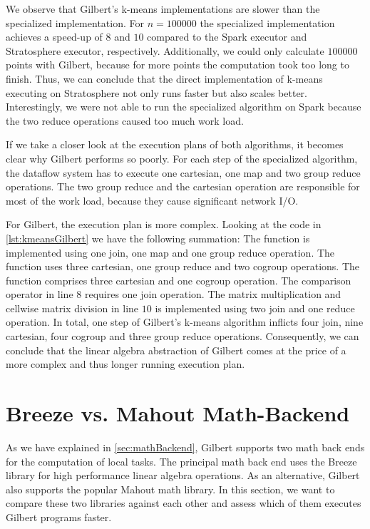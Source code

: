 We observe that Gilbert's k-means implementations are slower than the specialized implementation.
For $n=100000$ the specialized implementation achieves a speed-up of $8$ and $10$ compared to the Spark executor and Stratosphere executor, respectively.
Additionally, we could only calculate $100000$ points with Gilbert, because for more points the computation took too long to finish.
Thus, we can conclude that the direct implementation of k-means executing on Stratosphere not only runs faster but also scales better.
Interestingly, we were not able to run the specialized algorithm on Spark because the two reduce operations caused too much work load.

If we take a closer look at the execution plans of both algorithms, it becomes clear why Gilbert performs so poorly.
For each step of the specialized algorithm, the dataflow system has to execute one cartesian, one map and two group reduce operations.
The two group reduce and the cartesian operation are responsible for most of the work load, because they cause significant network I/O.

For Gilbert, the execution plan is more complex.
Looking at the code in \cref{lst:kmeansGilbert} we have the following summation:
The  function is implemented using one join, one map and one group reduce operation.
The  function uses three cartesian, one group reduce and two cogroup operations.
The  function comprises three cartesian and one cogroup operation.
The comparison operator in line $8$ requires one join operation.
The matrix multiplication and cellwise matrix division in line $10$ is implemented using two join and one reduce operation.
In total, one step of Gilbert's k-means algorithm inflicts four join, nine cartesian, four cogroup and three group reduce operations.
Consequently, we can conclude that the linear algebra abstraction of Gilbert comes at the price of a more complex and thus longer running execution plan.

\section{Breeze vs. Mahout Math-Backend}

As we have explained in \cref{sec:mathBackend}, Gilbert supports two math back ends for the computation of local tasks.
The principal math back end uses the Breeze library for high performance linear algebra operations.
As an alternative, Gilbert also supports the popular Mahout math library.
In this section, we want to compare these two libraries against each other and assess which of them executes Gilbert programs faster.

